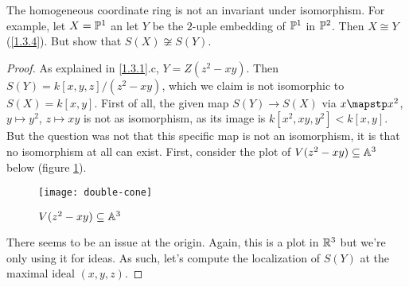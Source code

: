 \label{1.3.9}

The homogeneous coordinate ring is not an invariant under isomorphism. For example, let $X = \P^1$ an let $Y$ be the $2$-uple embedding of $\P^1$ in $\P^2$. Then $X \cong Y$ (\ref{1.3.4}). But show that $S(X) \not \cong S(Y)$.

\begin{proof}
    As explained in \ref{1.3.1}.c, $Y = Z(z^2 - xy)$. Then $S(Y) = k[x, y, z] / (z^2 - xy)$, which we claim is not isomorphic to $S(X) = k[x, y]$. First of all, the given map $S(Y) \longrightarrow S(X)$ via $x \mapstp x^2$, $y \mapsto y^2$, $z \mapsto xy$ is not as isomorphism, as its image is $k[x^2, xy, y^2] < k[x, y]$. But the question was not that this specific map is not an isomorphism, it is that no isomorphism at all can exist. First, consider the plot of $V(z^2 - xy) \subseteq \A^3$ below (figure \ref{fig1.3.2}).

    \begin{figure}[h]
        \centering
        \texttt{[image: double-cone]}
        \caption{$V(z^2 - xy) \subseteq \A^3$}
        \label{fig1.3.2}
    \end{figure}

    There seems to be an issue at the origin. Again, this is a plot in $\R^3$ but we're only using it for ideas. As such, let's compute the localization of $S(Y)$ at the maximal ideal $(x, y, z)$.
\end{proof}
